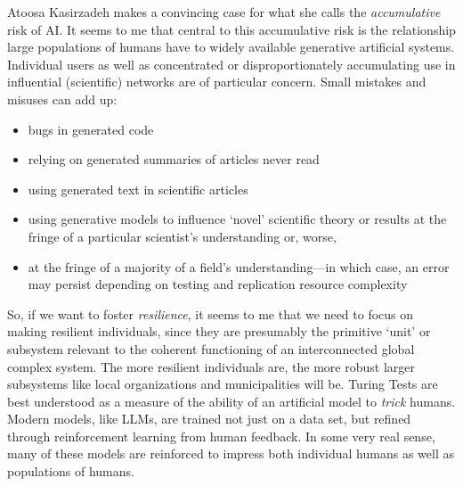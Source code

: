 \documentclass[11pt, oneside]{article}   	%
\begin{document}



Atoosa Kasirzadeh makes a convincing case for what she calls the \emph{accumulative} risk of AI. \citep{Kasirzadeh2024WIP}  It seems to me that central to this accumulative risk is the relationship large populations of humans have to widely available generative artificial systems.  Individual users as well as concentrated or disproportionately accumulating use in influential (scientific) networks are of particular concern.  Small mistakes and misuses can add up: 

\begin{itemize}
    \item bugs in generated code
    \item relying on generated summaries of articles never read
    \item using generated text in scientific articles
    \item using generative models to influence `novel' scientific theory or results at the fringe of a particular scientist's understanding or, worse, 
    \item at the fringe of a majority of a field's understanding---in which case, an error may persist depending on testing and replication resource complexity
\end{itemize}

So, if we want to foster \emph{resilience}, it seems to me that we need to focus on making resilient individuals, since they are presumably the primitive  `unit' or subsystem relevant to the coherent functioning of an interconnected global complex system.  The more resilient individuals are, the more robust  larger subsystems like local organizations and municipalities will be.  Turing Tests are best understood as a measure of the ability of an artificial model to \emph{trick} humans.  Modern models, like LLMs, are trained not just on a data set, but refined through reinforcement learning from human feedback. In some very real sense, many of these models are reinforced to impress both individual humans as well as populations of humans. 
\end{document}
